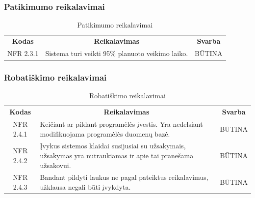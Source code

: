 \documentclass{VUMIFPSkursinis}
\begin{document}
\subsubsection{Patikimumo reikalavimai}

\begin{center}
	\begin{table}[H]
	\caption{Patikimumo reikalavimai}
	\begin{tabular}{|p{2cm}|p{}|p{}|}
	\hline
	    \rowcolor{lightgray}
		\multicolumn{3}{|c|}{Patikimumo reikalavimai}\\
		
	\hline
		\multicolumn{1}{|c|}{{\bfseries Kodas}}&
		\multicolumn{1}{|c|}{{\bfseries Reikalavimas}}&
		\multicolumn{1}{|c|}{{\bfseries Svarba}}\\
	\hline 	
		\multicolumn{1}{|c|}{NFR 2.3.1}&
		{Sistema turi veikti 95\% planuoto veikimo laiko. }&
		\multicolumn{1}{|c|}{BŪTINA}\\	
	\hline 	 	 	
	\end{tabular}
	
	\label{table:Patikimumoreikalavimai}
	\end{table}

\end{center}



\subsubsection{Robatiškimo reikalavimai}

\begin{center}
	\begin{table}[H]
	\caption{Robatiškimo reikalavimai}
	\begin{tabular}{|p{2cm}|p{}|p{}|}
	\hline
	    \rowcolor{lightgray}
		\multicolumn{3}{|c|}{Robatiškumo reikalavimai}\\
		
	\hline
		\multicolumn{1}{|c|}{{\bfseries Kodas}}&
		\multicolumn{1}{|c|}{{\bfseries Reikalavimas}}&
		\multicolumn{1}{|c|}{{\bfseries Svarba}}\\
	\hline 	
		\multicolumn{1}{|c|}{NFR 2.4.1}&
		{Keičiant ar pildant programėlės įvestis. Yra nedelsiant modifikuojama programėlės duomenų bazė.}&
		\multicolumn{1}{|c|}{BŪTINA}\\
		
	\hline 	
		\multicolumn{1}{|c|}{NFR 2.4.2}&
		{Įvykus sistemos klaidai susijusiai su užsakymais, užsakymas yra nutraukiamas ir apie tai pranešama užsakovui.}&
		\multicolumn{1}{|c|}{BŪTINA}\\
		
	\hline 	
		\multicolumn{1}{|c|}{NFR 2.4.3}&
		{Bandant pildyti laukus ne pagal pateiktus reikalavimus, užklausa negali būti įvykdyta.}&
		\multicolumn{1}{|c|}{BŪTINA}\\
		
	\hline
	
	
	\end{tabular}
	
	\label{table:Robatiškimoreikalavimai}
	\end{table}

\end{center}
\end{document}
